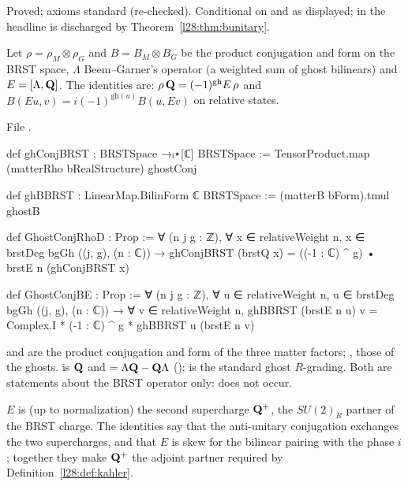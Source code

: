 \begin{status}
Proved; axioms standard (re-checked). Conditional on  and  as displayed; in the headline  is discharged by
Theorem~\ref{l28:thm:bunitary}.
\end{status}

\begin{definition}\label{l28:def:ghostconj}
Let $\rho=\rho_M\otimes\rho_G$ and $B=B_M\otimes B_G$ be the product conjugation and form on the BRST space, $\Lambda$ Beem--Garner's operator
(a weighted sum of ghost bilinears) and $E=[\Lambda,\mathbf Q]$. The identities are: $\rho\,\mathbf Q=(-1)^{\mathrm{gh}}E\,\rho$ and
$B(Eu,v)=i(-1)^{\mathrm{gh}(u)}B(u,Ev)$ on relative states.
\end{definition}

\noindent File .
\begin{leancode}
def ghConjBRST : BRSTSpace →ₗ⋆[ℂ] BRSTSpace :=
  TensorProduct.map (matterRho bRealStructure) ghostConj

def ghBBRST : LinearMap.BilinForm ℂ BRSTSpace := (matterB bForm).tmul ghostB

def GhostConjRhoD : Prop :=
  ∀ (n j g : ℤ), ∀ x ∈ relativeWeight n, x ∈ brstDeg bgGh ((j, g), (n : ℂ)) →
    ghConjBRST (brstQ x) = ((-1 : ℂ) ^ g) • brstE n (ghConjBRST x)

def GhostConjBE : Prop :=
  ∀ (n j g : ℤ), ∀ u ∈ relativeWeight n, u ∈ brstDeg bgGh ((j, g), (n : ℂ)) →
    ∀ v ∈ relativeWeight n,
      ghBBRST (brstE n u) v = Complex.I * (-1 : ℂ) ^ g * ghBBRST u (brstE n v)
\end{leancode}

\begin{dictionary}
 and  are the product conjugation and form of the three matter factors; ,
 those of the ghosts.  is $\mathbf Q$ and $=\Lambda\mathbf Q-\mathbf Q\Lambda$
();  is the standard ghost $R$-grading. Both are statements about the BRST operator only: 
does not occur.
\end{dictionary}

\begin{physics}
$E$ is (up to normalization) the second supercharge $\mathbf Q^+$, the $SU(2)_R$ partner of the BRST charge. The identities say that the
anti-unitary conjugation exchanges the two supercharges, and that $E$ is skew for the bilinear pairing with the phase $i$; together they make
$\mathbf Q^+$ the adjoint partner required by Definition~\ref{l28:def:kahler}.
\end{physics}

